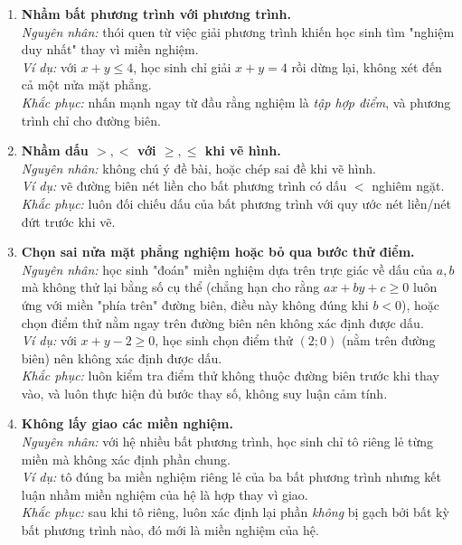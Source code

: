 \documentclass[12pt,a4paper]{report}
\begin{document}
\begin{enumerate}[label=\textbf{(\arabic*)}, leftmargin=1.6cm]

\item \textbf{Nhầm bất phương trình với phương trình.}\\
\textit{Nguyên nhân:} thói quen từ việc giải phương trình khiến học sinh tìm "nghiệm duy nhất" thay vì miền nghiệm.\\
\textit{Ví dụ:} với $x+y\le 4$, học sinh chỉ giải $x+y=4$ rồi dừng lại, không xét đến cả một nửa mặt phẳng.\\
\textit{Khắc phục:} nhấn mạnh ngay từ đầu rằng nghiệm là \emph{tập hợp điểm}, và phương trình chỉ cho đường biên.

\item \textbf{Nhầm dấu $>,<$ với $\ge,\le$ khi vẽ hình.}\\
\textit{Nguyên nhân:} không chú ý đề bài, hoặc chép sai đề khi vẽ hình.\\
\textit{Ví dụ:} vẽ đường biên nét liền cho bất phương trình có dấu $<$ nghiêm ngặt.\\
\textit{Khắc phục:} luôn đối chiếu dấu của bất phương trình với quy ước nét liền/nét đứt trước khi vẽ.

\item \textbf{Chọn sai nửa mặt phẳng nghiệm hoặc bỏ qua bước thử điểm.}\\
\textit{Nguyên nhân:} học sinh "đoán" miền nghiệm dựa trên trực giác về dấu của $a,b$ mà không thử lại bằng số cụ thể (chẳng hạn cho rằng $ax+by+c\ge0$ luôn ứng với miền "phía trên" đường biên, điều này không đúng khi $b<0$), hoặc chọn điểm thử nằm ngay trên đường biên nên không xác định được dấu.\\
\textit{Ví dụ:} với $x+y-2\ge0$, học sinh chọn điểm thử $(2;0)$ (nằm trên đường biên) nên không xác định được dấu.\\
\textit{Khắc phục:} luôn kiểm tra điểm thử không thuộc đường biên trước khi thay vào, và luôn thực hiện đủ bước thay số, không suy luận cảm tính.

\item \textbf{Không lấy giao các miền nghiệm.}\\
\textit{Nguyên nhân:} với hệ nhiều bất phương trình, học sinh chỉ tô riêng lẻ từng miền mà không xác định phần chung.\\
\textit{Ví dụ:} tô đúng ba miền nghiệm riêng lẻ của ba bất phương trình nhưng kết luận nhầm miền nghiệm của hệ là hợp thay vì giao.\\
\textit{Khắc phục:} sau khi tô riêng, luôn xác định lại phần \emph{không} bị gạch bởi bất kỳ bất phương trình nào, đó mới là miền nghiệm của hệ.


\end{enumerate}
\end{document}
